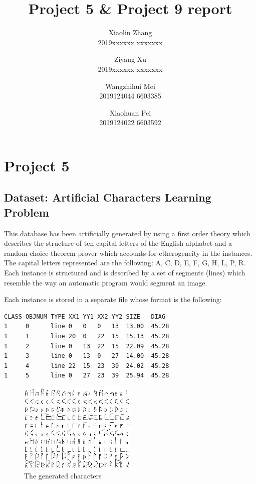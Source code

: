 \documentclass[11pt,en]{elegantpaper}
\title{Project 5 \& Project 9 report}
\author{Xiaolin Zhang \\ 2019xxxxxx xxxxxxx \and Ziyang Xu \\2019xxxxxx xxxxxxx  \and Wangzhihui Mei \\ 2019124044 6603385  \and Xiaohuan Pei \\ 2019124022 6603592}
\institute{CCNU-UOW JI}
\date{}
\begin{document}
\maketitle


\section{Project 5}
\subsection{Dataset: Artificial Characters Learning Problem}

This database has been artificially generated by using a first order theory which describes the structure of ten capital letters of the English alphabet and a random choice theorem prover which accounts for etherogeneity in the instances. The capital letters represented are the following: A, C, D, E, F, G, H, L, P, R. Each instance is structured and is described by a set of segments (lines) which resemble the way an automatic program would segment an image. 


Each instance is stored in a separate file whose format is the following:
\begin{lstlisting}
CLASS OBJNUM TYPE XX1 YY1 XX2 YY2 SIZE   DIAG
1     0      line 0   0   0   13  13.00  45.28
1     1      line 20  0   22  15  15.13  45.28
1     2      line 0   13  22  15  22.09  45.28
1     3      line 0   13  0   27  14.00  45.28
1     4      line 22  15  23  39  24.02  45.28
1     5      line 0   27  23  39  25.94  45.28
\end{lstlisting}

\begin{figure}[h]
	\centering
	\includegraphics[width=0.5\textwidth]{image/chars}
	\caption{The generated characters}
	\label{chars}
\end{figure}
\end{document}
